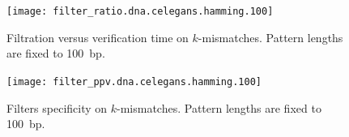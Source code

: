 \begin{figure}[t]
\begin{center}
\caption[Filtration versus verification time on $k$-mismatches]{Filtration versus verification time on $k$-mismatches. Pattern lengths are fixed to 100~bp.}
\label{fig:filter-ratio-hamming-celegans}
\texttt{[image: filter\_ratio.dna.celegans.hamming.100]}
\end{center}
\end{figure}

\begin{figure}[b]
\begin{center}
\caption[Filters specificity on $k$-mismatches]{Filters specificity on $k$-mismatches. Pattern lengths are fixed to 100~bp.}
\label{fig:filter-ppv-hamming-celegans}
\texttt{[image: filter\_ppv.dna.celegans.hamming.100]}
\end{center}
\end{figure}


